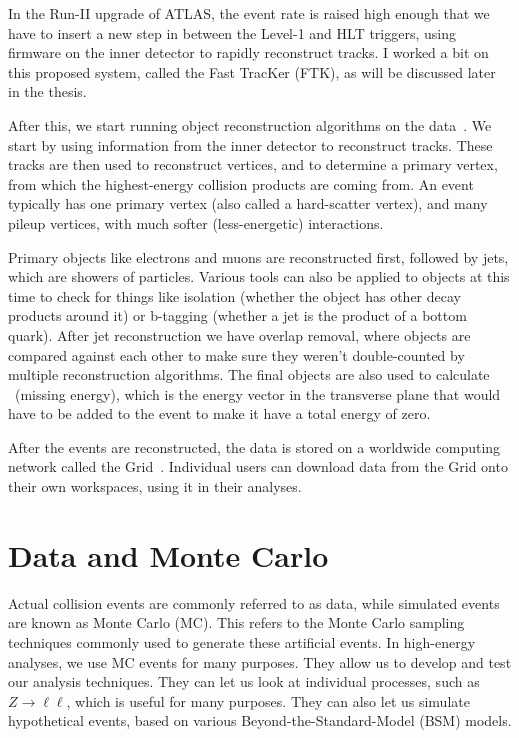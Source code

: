 In the Run-II upgrade of ATLAS, the event rate is raised high enough that we have to insert a new step in between the Level-1 and HLT triggers, using firmware on the inner detector to rapidly reconstruct tracks. I worked a bit on this proposed system, called the Fast TracKer (FTK), as will be discussed later in the thesis.

After this, we start running object reconstruction algorithms on the data~\cite{ATLAS_TDR}. We start by using information from the inner detector to reconstruct tracks. These tracks are then used to reconstruct vertices, and to determine a primary vertex, from which the highest-energy collision products are coming from. An event typically has one primary vertex (also called a hard-scatter vertex), and many pileup vertices, with much softer (less-energetic) interactions.

Primary objects like electrons and muons are reconstructed first, followed by jets, which are showers of particles. Various tools can also be applied to objects at this time to check for things like isolation (whether the object has other decay products around it) or b-tagging (whether a jet is the product of a bottom quark). After jet reconstruction we have overlap removal, where objects are compared against each other to make sure they weren't double-counted by multiple reconstruction algorithms. The final objects are also used to calculate \MET\ (missing energy), which is the energy vector in the transverse plane that would have to be added to the event to make it have a total energy of zero.

After the events are reconstructed, the data is stored on a worldwide computing network called the Grid~\cite{Grid}. Individual users can download data from the Grid onto their own workspaces, using it in their analyses.

\section{Data and Monte Carlo}

Actual collision events are commonly referred to as data, while simulated events are known as Monte Carlo (MC). This refers to the Monte Carlo sampling techniques commonly used to generate these artificial events. In high-energy analyses, we use MC events for many purposes. They allow us to develop and test our analysis techniques. They can let us look at individual processes, such as $Z\rightarrow\ell\ell$, which is useful for many purposes. They can also let us simulate hypothetical events, based on various Beyond-the-Standard-Model (BSM) models.

